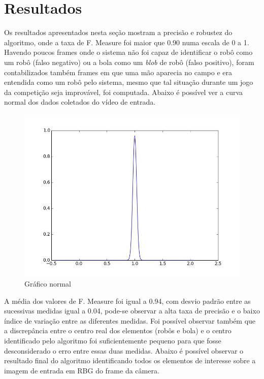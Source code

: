 \documentclass[conference, harvard, brazil, english]{sbatex}
\begin{document}
	\section{Resultados}
		Os resultados apresentados nesta seção mostram a precisão e robustez do algoritmo, onde a taxa de F. Measure foi maior que 0.90 numa escala de 0 a 1. Havendo poucos frames onde o sistema não foi capaz de identificar o robô como um robô (falso negativo) ou a bola como um \textit{blob} de robô (falso positivo), foram contabilizados também frames em que uma mão aparecia no campo e era entendida como um robô pelo sistema, mesmo que tal situação durante um jogo da competição seja improvável, foi computada. Abaixo é possível ver a curva normal dos dados coletados do vídeo de entrada.\\
		\begin{figure}[h]
			\centering
			\includegraphics[scale=0.3]{grafico}
			\caption{Gráfico normal}
		\end{figure}
		A média dos valores de F. Measure foi igual a 0.94, com desvio padrão entre as sucessivas medidas igual a 0.04, pode-se observar a alta taxa de precisão e o baixo índice de variação entre as diferentes medidas.
		Foi possível observar também que a discrepância entre o centro real dos elementos (robôs e bola) e o centro identificado pelo algoritmo foi suficientemente pequeno para que fosse desconsiderado o erro entre essas duas medidas. Abaixo é possível observar o resultado final do algoritmo identificando todos os elementos de interesse sobre a imagem de entrada em RBG do frame da câmera.\\
\end{document}
